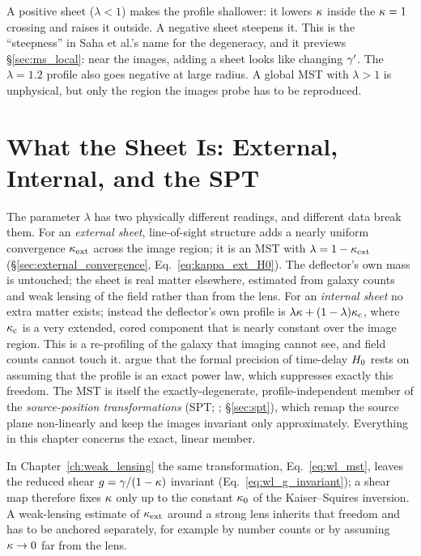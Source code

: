 \begin{annotation}
A positive sheet ($\lambda<1$) makes the profile shallower: it lowers
$\kappa$ inside the $\kappa=1$ crossing and raises it outside.  A negative
sheet steepens it.  This is the ``steepness'' in Saha et al.'s name for the
degeneracy, and it previews \S\ref{sec:ms_local}: near the images, adding a
sheet looks like changing $\gamma'$.  The $\lambda=1.2$ profile also
goes negative at large radius.  A global MST with $\lambda>1$ is unphysical,
but only the region the images probe has to be reproduced.
\end{annotation}


\section{What the Sheet Is: External, Internal, and the SPT}
\label{sec:ms_what_sheet}

The parameter $\lambda$ has two physically different readings, and different
data break them.  For an \emph{external sheet}, line-of-sight structure adds
a nearly uniform convergence $\kappa_{\rm ext}$ across the image region; it is
an MST with $\lambda=1-\kappa_{\rm ext}$ (\S\ref{sec:external_convergence},
Eq.~\ref{eq:kappa_ext_H0}).  The deflector's own mass is untouched; the sheet
is real matter elsewhere, estimated from galaxy counts and weak lensing of the
field rather than from the lens.  For an \emph{internal sheet} no extra
matter exists; instead the deflector's own profile is
$\lambda\kappa+(1-\lambda)\kappa_{\rm c}$, where $\kappa_{\rm c}$ is a very
extended, cored component that is nearly constant over the image region.
This is a re-profiling of the galaxy that imaging cannot see, and field
counts cannot touch it.  \citet{schneider_sluse_2013} argue that the formal
precision of time-delay $H_0$ rests on assuming that the profile is an
exact power law, which suppresses exactly this freedom.
The MST is itself the exactly-degenerate, profile-independent member of the
\emph{source-position transformations} (SPT;
\citealp{schneider_sluse_2014}; \S\ref{sec:spt}), which remap the source plane
non-linearly and keep the images invariant only approximately.  Everything in
this chapter concerns the exact, linear member.

\begin{bridge}
In Chapter~\ref{ch:weak_lensing} the same transformation,
Eq.~\eqref{eq:wl_mst}, leaves the reduced shear $g=\gamma/(1-\kappa)$
invariant (Eq.~\ref{eq:wl_g_invariant}); a shear map therefore fixes $\kappa$
only up to the constant $\kappa_0$ of the Kaiser--Squires inversion.  A
weak-lensing estimate of $\kappa_{\rm ext}$ around a strong lens inherits that
freedom and has to be anchored separately, for example by number counts or by
assuming $\kappa\to0$ far from the lens.
\end{bridge}


